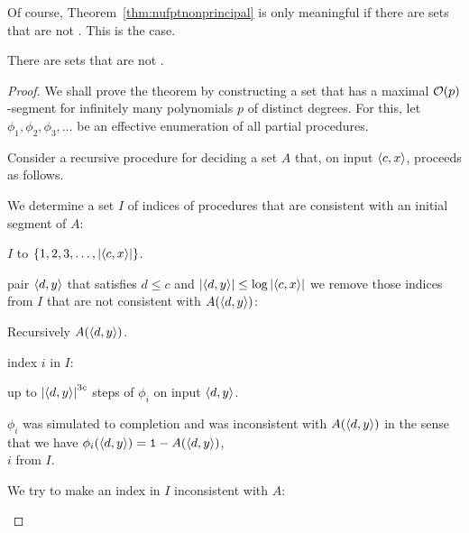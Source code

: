 Of course, Theorem~\ref{thm:nufptnonprincipal} is only meaningful if there are  sets that are not .
This is the case.
\begin{theorem}
  There are  sets that are not .
\end{theorem}
\begin{proof}
  We shall prove the theorem by constructing a  set that has a maximal $\operatorname{\mathcal{O}}(p)$-segment for infinitely many polynomials $p$ of distinct degrees.
  For this, let $\phi_1, \phi_2, \phi_3, \ldots$ be an effective enumeration of all partial procedures.

  Consider a recursive procedure for deciding a set $A$ that, on input ${\langle c, x\rangle}$, proceeds as follows.
  \begin{codelisting}
  \item
    We determine a set $I$ of indices of procedures that are consistent with an initial segment of $A$:
    \begin{codelisting}
    \item
       $I$ to $\{1, 2, 3, \ldots, \length{\pair{c}{x}}\}$.
    \item
       pair $\pair{d}{y}$ that satisfies $d \le c$ and $\length{\pair{d}{y}} \le \log \length{\pair{c}{x}}$ we remove those indices from $I$ that are not consistent with $A(\pair{d}{y})$:
      \begin{codelisting}
      \item
        Recursively  $A(\pair{d}{y})$.
      \item
         index $i$ in $I$:
        \begin{codelisting}
        \item
           up to $\length{\pair{d}{y}}^{3c}$ steps of $\phi_i$ on input $\pair{d}{y}$.
        \item
           $\phi_i$ was simulated to completion and was inconsistent with $A(\pair{d}{y})$ in the sense that we have $\phi_i(\pair{d}{y}) = \bits{1} - A(\pair{d}{y})$,
          \\\-\quad {} $i$ from $I$.
        \end{codelisting}
      \end{codelisting}
    \end{codelisting}
  \item
    We try to make an index in $I$ inconsistent with $A$:
    \begin{codelisting}

\end{codelisting}
\end{codelisting}
\end{proof}
